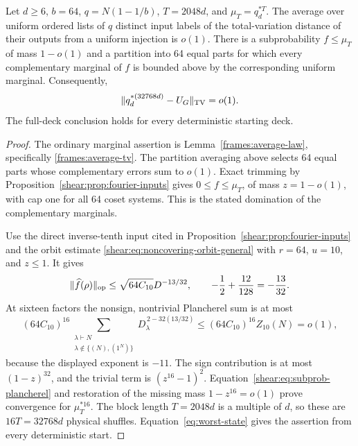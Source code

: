 \begin{proposition}
\label{frames:average-marginals}
Let \(d\ge6\), \(b=64\), \(q=N(1-1/b)\), \(T=2048d\), and
\(\mu_T=q_d^{*T}\). The average over uniform ordered lists of \(q\)
distinct input labels of the total-variation distance of their outputs
from a uniform injection is \(o(1)\). There is a subprobability
\(f\le\mu_T\) of mass \(1-o(1)\) and a partition into 64 equal parts
for which every complementary marginal of \(f\) is bounded above by
the corresponding uniform marginal. Consequently,
\[
 \|q_d^{*(32768d)}-U_G\|_{\mathrm{TV}}=o(1).
\]
The full-deck conclusion holds for every deterministic starting deck.
\end{proposition}
\begin{proof}
The ordinary marginal assertion is Lemma~\ref{frames:average-law},
specifically \eqref{frames:average-tv}. The partition averaging above
selects 64 equal parts whose complementary errors sum to \(o(1)\).
Exact trimming by Proposition~\ref{shear:prop:fourier-inputs} gives
\(0\le f\le\mu_T\), of mass \(z=1-o(1)\), with cap one for all 64
coset systems. This is the stated domination of the complementary
marginals.

Use the direct inverse-tenth input cited in
Proposition~\ref{shear:prop:fourier-inputs} and the orbit estimate
\eqref{shear:eq:noncovering-orbit-general} with
\(r=64\), \(u=10\), and \(z\le1\). It gives
\[
 \|\widehat f(\rho)\|_{\mathrm{op}}
 \le\sqrt{64C_{10}}D^{-13/32},
 \qquad -\frac12+\frac{12}{128}=-\frac{13}{32}.
\]
At sixteen factors the nonsign, nontrivial Plancherel sum is at most
\[
 (64C_{10})^{16}
 \sum_{\substack{\lambda\vdash N\\
                  \lambda\notin\{(N),(1^N)\}}}
 D_\lambda^{\,2-32(13/32)}
 \le(64C_{10})^{16}Z_{10}(N)=o(1),
\]
because the displayed exponent is \(-11\). The sign contribution is
at most \((1-z)^{32}\), and the trivial term is \((z^{16}-1)^2\).
Equation~\eqref{shear:eq:subprob-plancherel} and restoration of the
missing mass \(1-z^{16}=o(1)\) prove convergence for \(\mu_T^{*16}\).
The block length \(T=2048d\) is a multiple of \(d\), so these are
\(16T=32768d\) physical shuffles. Equation~\eqref{eq:worst-state}
gives the assertion from every deterministic start.
\end{proof}


